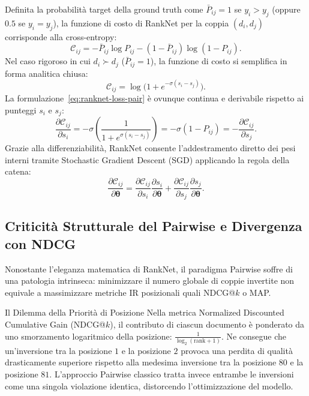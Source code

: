 Definita la probabilit\`a target della ground truth come $\bar{P}_{ij} = 1$ se $y_i > y_j$ (oppure $0.5$ se $y_i = y_j$), la funzione di costo di RankNet per la coppia $(d_i, d_j)$ corrisponde alla cross-entropy:
\begin{equation}
    \mathcal{C}_{ij} = -\bar{P}_{ij} \log P_{ij} - (1 - \bar{P}_{ij}) \log(1 - P_{ij}).
\end{equation}
Nel caso rigoroso in cui $d_i \succ d_j$ ($\bar{P}_{ij} = 1$), la funzione di costo si semplifica in forma analitica chiusa:
\begin{equation}
    \mathcal{C}_{ij} = \log\big(1 + e^{-\sigma (s_i - s_j)}\big).
    \label{eq:ranknet-loss-pair}
\end{equation}
La formulazione~\eqref{eq:ranknet-loss-pair} \`e ovunque continua e derivabile rispetto ai punteggi $s_i$ e $s_j$:
\begin{equation}
    \frac{\partial \mathcal{C}_{ij}}{\partial s_i} = -\sigma \left(\frac{1}{1 + e^{\sigma (s_i - s_j)}}\right) = -\sigma (1 - P_{ij}) = -\frac{\partial \mathcal{C}_{ij}}{\partial s_j}.
    \label{eq:ranknet-derivatives}
\end{equation}
Grazie alla differenziabilit\`a, RankNet consente l'addestramento diretto dei pesi interni tramite Stochastic Gradient Descent (SGD) applicando la regola della catena:
\begin{equation}
    \frac{\partial \mathcal{C}_{ij}}{\partial \mathbf{\theta}} = \frac{\partial \mathcal{C}_{ij}}{\partial s_i} \frac{\partial s_i}{\partial \mathbf{\theta}} + \frac{\partial \mathcal{C}_{ij}}{\partial s_j} \frac{\partial s_j}{\partial \mathbf{\theta}}.
\end{equation}

\FloatBarrier
\subsection{Criticit\`a Strutturale del Pairwise e Divergenza con NDCG}
\label{subsec:criticita-pairwise-ndcg}

Nonostante l'eleganza matematica di RankNet, il paradigma Pairwise soffre di una patologia intrinseca: minimizzare il numero globale di coppie invertite non equivale a massimizzare metriche IR posizionali quali NDCG@$k$ o MAP.

\begin{alertblock}{Il Dilemma della Priorit\`a di Posizione}
Nella metrica Normalized Discounted Cumulative Gain (NDCG@$k$), il contributo di ciascun documento \`e ponderato da uno smorzamento logaritmico della posizione: $\frac{1}{\log_2(\text{rank} + 1)}$.  
Ne consegue che un'inversione tra la posizione $1$ e la posizione $2$ provoca una perdita di qualit\`a drasticamente superiore rispetto alla medesima inversione tra la posizione $80$ e la posizione $81$. L'approccio Pairwise classico tratta invece entrambe le inversioni come una singola violazione identica, distorcendo l'ottimizzazione del modello.
\end{alertblock}


